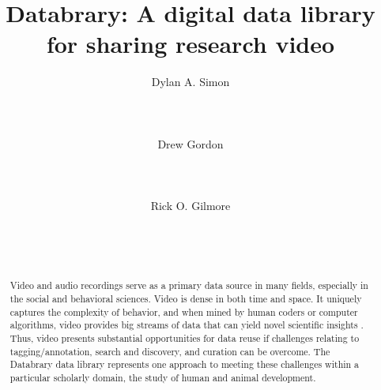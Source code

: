 \documentclass{sig-alternate}
\begin{document}

\title{Databrary: A digital data library for sharing research video}


\author{
\alignauthor
Dylan A. Simon\\
	\\
	\\
	\\
\alignauthor
Drew Gordon\\
	\\
	\\
	\\
\alignauthor
Rick O. Gilmore\\
	\\
	\\
	\\
}

\maketitle

\begin{abstract}

Video and audio recordings serve as a primary data source in many fields, especially in the social and behavioral sciences. 
Video is dense in both time and space.
It uniquely captures the complexity of behavior, and when mined by human coders or computer algorithms, video provides big streams of data that can yield novel scientific insights \cite{raudies_visual_2014}.
Thus, video presents substantial opportunities for data reuse if challenges relating to tagging/annotation, search and discovery, and curation can be overcome.
The Databrary data library represents one approach to meeting these challenges within a particular scholarly domain, the study of human and animal development.

\end{abstract}
\end{document}
